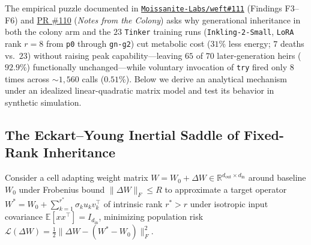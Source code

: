 \documentclass[10pt,a4paper]{article}
\begin{document}
The empirical puzzle documented in \href{https://github.com/Moissanite-Labs/weft/issues/111}{\texttt{Moissanite-Labs/weft\#111}} (Findings F3--F6) and \href{https://github.com/Moissanite-Labs/weft/pull/110}{PR \#110} (\emph{Notes from the Colony}) asks why generational inheritance in both the colony arm and the $23$ \texttt{Tinker} training runs (\texttt{Inkling-2-Small}, \texttt{LoRA} rank $r=8$ from \texttt{p0} through \texttt{gn-g2}) cut metabolic cost ($31\%$ less energy; $7$ deaths vs.\ $23$) without raising peak capability---leaving $65$ of $70$ later-generation heirs ($92.9\%$) functionally unchanged---while voluntary invocation of \texttt{try} fired only $8$ times across $\sim 1{,}560$ calls ($0.51\%$). Below we derive an analytical mechanism under an idealized linear-quadratic matrix model and test its behavior in synthetic simulation.

\subsection{The Eckart--Young Inertial Saddle of Fixed-Rank Inheritance}

Consider a cell adapting weight matrix $W = W_0 + \Delta W \in \mathbb{R}^{d_{\text{out}} \times d_{\text{in}}}$ around baseline $W_0$ under Frobenius bound $\|\Delta W\|_F \le R$ to approximate a target operator $W^* = W_0 + \sum_{k=1}^{r^*} \sigma_k u_k v_k^\top$ of intrinsic rank $r^* > r$ under isotropic input covariance $\mathbb{E}[x x^\top] = I_{d_{\text{in}}}$, minimizing population risk $\mathcal{L}(\Delta W) = \frac{1}{2}\|\Delta W - (W^* - W_0)\|_F^2$.
\end{document}
